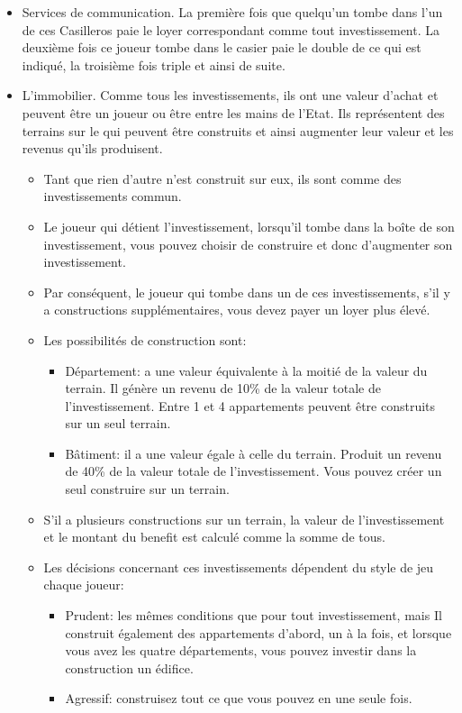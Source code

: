 \documentclass[12pt]{article}
\begin{document}
\begin{itemize}
    \item Services de communication. La première fois que quelqu'un tombe dans l'un de ces
Casilleros paie le loyer correspondant comme tout investissement. La deuxième fois
ce joueur tombe dans le casier paie le double de ce qui est indiqué, la troisième fois triple
et ainsi de suite.

    \item L'immobilier. Comme tous les investissements, ils ont une valeur d'achat et peuvent être
un joueur ou être entre les mains de l'Etat. Ils représentent des terrains sur le
qui peuvent être construits et ainsi augmenter leur valeur et les revenus qu'ils produisent.
    \begin{itemize}
        \item Tant que rien d'autre n'est construit sur eux, ils sont comme des investissements
commun.
        \item Le joueur qui détient l'investissement, lorsqu'il tombe dans la boîte de son
investissement, vous pouvez choisir de construire et donc d'augmenter son investissement.
        \item Par conséquent, le joueur qui tombe dans un de ces investissements, s'il y a
constructions supplémentaires, vous devez payer un loyer plus élevé.
        \item Les possibilités de construction sont:
            \begin{itemize}
                \item Département: a une valeur équivalente à la moitié de la valeur du
                terrain. Il génère un revenu de 10\% de la valeur totale de l'investissement.
                Entre 1 et 4 appartements peuvent être construits sur un seul terrain.
                \item Bâtiment: il a une valeur égale à celle du terrain. Produit un revenu de
                40\% de la valeur totale de l'investissement. Vous pouvez créer un seul
                construire sur un terrain.
            \end{itemize}
        \item S'il a plusieurs constructions sur un terrain, la valeur de l'investissement
et le montant du benefit est calculé comme la somme de tous.
        \item Les décisions concernant ces investissements dépendent du style de jeu
chaque joueur:
            \begin{itemize}
                \item Prudent: les mêmes conditions que pour tout investissement, mais
Il construit également des appartements d'abord, un à la fois, et
lorsque vous avez les quatre départements, vous pouvez investir dans la construction
un édifice.
                \item Agressif: construisez tout ce que vous pouvez en une seule fois.
            \end{itemize}


\end{itemize}
\end{itemize}
\end{document}

